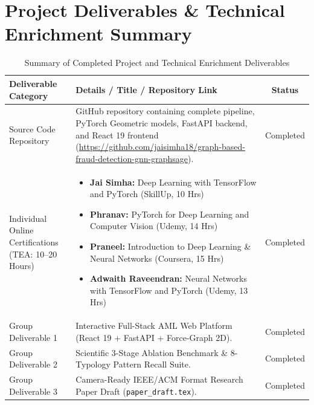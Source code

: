 \documentclass[11pt, a4paper]{article}
\begin{document}
\section{Project Deliverables \& Technical Enrichment Summary}
\begin{table}[H]
    \centering
    \footnotesize
    \renewcommand{\arraystretch}{1.20}
    \begin{tabular}{|p{4.2cm}|p{7.8cm}|c|}
        \hline
        \textbf{Deliverable Category} & \textbf{Details / Title / Repository Link} & \textbf{Status} \\
        \hline
        Source Code Repository & GitHub repository containing complete pipeline, PyTorch Geometric models, FastAPI backend, and React 19 frontend (\url{https://github.com/jaisimha18/graph-based-fraud-detection-gnn-graphsage}). & Completed \\
        \hline
        Individual Online Certifications (TEA: 10--20 Hours) &
        \begin{itemize}[noitemsep, leftmargin=*]
            \item \textbf{Jai Simha:} Deep Learning with TensorFlow and PyTorch (SkillUp, 10 Hrs)
            \item \textbf{Phranav:} PyTorch for Deep Learning and Computer Vision (Udemy, 14 Hrs)
            \item \textbf{Praneel:} Introduction to Deep Learning \& Neural Networks (Coursera, 15 Hrs)
            \item \textbf{Adwaith Raveendran:} Neural Networks with TensorFlow and PyTorch (Udemy, 13 Hrs)
        \end{itemize} & Completed \\
        \hline
        Group Deliverable 1 & Interactive Full-Stack AML Web Platform (React 19 + FastAPI + Force-Graph 2D). & Completed \\
        \hline
        Group Deliverable 2 & Scientific 3-Stage Ablation Benchmark \& 8-Typology Pattern Recall Suite. & Completed \\
        \hline
        Group Deliverable 3 & Camera-Ready IEEE/ACM Format Research Paper Draft (\texttt{paper\_draft.tex}). & Completed \\
        \hline
    \end{tabular}
    \caption{Summary of Completed Project and Technical Enrichment Deliverables}
    \label{tab:deliverables}
\end{table}
\end{document}
